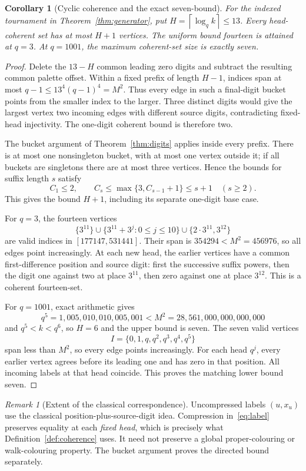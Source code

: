 \documentclass[11pt]{amsart}
\newtheorem{corollary}[theorem]{Corollary}
\theoremstyle{definition}
\theoremstyle{remark}
\newtheorem{remark}[theorem]{Remark}
\newcommand{\ceil}[1]{\left\lceil#1\right\rceil}
\begin{document}
\begin{corollary}[Cyclic coherence and the exact seven-bound]
\label{cor:cyclic}
For the indexed tournament in Theorem~\ref{thm:generator}, put
$H=\ceil{\log_q k}\le13$. Every head-coherent set has at most $H+1$
vertices. The uniform bound fourteen is attained at $q=3$.
At $q=1001$, the maximum coherent-set size is exactly seven.
\end{corollary}
\begin{proof}
Delete the $13-H$ common leading zero digits and subtract the resulting
common palette offset. Within a fixed prefix of length $H-1$, indices span
at most $q-1\le13^4(q-1)^4=M^2$. Thus every edge in such a final-digit
bucket points from the smaller index to the larger. Three distinct digits
would give the largest vertex two incoming edges with different source
digits, contradicting fixed-head injectivity. The one-digit coherent bound
is therefore two.

The bucket argument of Theorem~\ref{thm:digits} applies inside every prefix.
There is at most one nonsingleton bucket, with at most one vertex outside
it; if all buckets are singletons there are at most three vertices.
Hence the bounds for suffix length $s$ satisfy
\[
 C_1\le2,\qquad
 C_s\le\max\{3,C_{s-1}+1\}\le s+1\quad(s\ge2).
\]
This gives the bound $H+1$, including its separate one-digit base case.

For $q=3$, the fourteen vertices
\[
 \{3^{11}\}\cup\{3^{11}+3^j:0\le j\le10\}
 \cup\{2\cdot3^{11},3^{12}\}
\]
are valid indices in $[177147,531441]$. Their span is
$354294<M^2=456976$, so all edges point increasingly. At each new head,
the earlier vertices have a common first-difference position and source
digit: first the successive suffix powers, then the digit one against
two at place $3^{11}$, then zero against one at place $3^{12}$.
This is a coherent fourteen-set.

For $q=1001$, exact arithmetic gives
\[
 q^5=1{,}005{,}010{,}010{,}005{,}001
 <M^2=28{,}561{,}000{,}000{,}000{,}000
\]
and $q^5<k<q^6$, so $H=6$ and the upper bound is seven.
The seven valid vertices
\[
 I=\{0,1,q,q^2,q^3,q^4,q^5\}
\]
span less than $M^2$, so every edge points increasingly. For each head
$q^j$, every earlier vertex agrees before its leading one and has zero
in that position. All incoming labels at that head coincide. This proves
the matching lower bound seven.
\end{proof}

\begin{remark}[Extent of the classical correspondence]
Uncompressed labels $(u,x_u)$ use the classical position-plus-source-digit
idea. Compression in~\eqref{eq:label} preserves equality at each
\emph{fixed head}, which is precisely what Definition~\ref{def:coherence}
uses. It need not preserve a global proper-colouring or walk-colouring
property. The bucket argument proves the directed bound separately.
\end{remark}
\end{document}
